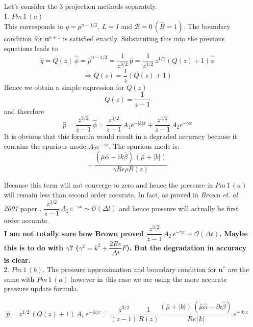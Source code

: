 Let's consider the 3 projection methods separately.\\
1. $Pm\,1 \, (a)$\\
This corresponds to $q = p^{n-1/2}$, $L = I$ and $\mathcal{B} = 0 \, (\hat{B} = 1)$. The boundary condition for $\textbf{u}^{n+1}$ is satisfied exactly. Substituting this into the previous equations leads to
\begin{equation*}
\hat{q} = Q(z)\,\hat{\phi} = \hat{p}^{n-1/2} = \dfrac{1}{z^{3/2}}\,\hat{p} = \dfrac{1}{z^{3/2}} \, z^{1/2} (Q(z) + 1) \hat{\phi}
\end{equation*}
\begin{equation*}
\Rightarrow Q(z) = \dfrac{1}{z} (Q(z) + 1)
\end{equation*}
Hence we obtain a simple expression for $Q(z)$
\begin{equation}
Q(z) = \dfrac{1}{z-1}
\end{equation}
and therefore
\begin{equation}
\hat{p} = \dfrac{z^{3/2}}{z-1} \, \hat{\phi} = \dfrac{z^{3/2}}{z-1}\, A_1 e^{-|k|x} + \dfrac{z^{3/2}}{z-1} \, A_2 e^{-\gamma x}
\end{equation}
It is obvious that this formula would result in a degraded accuracy because it contains the spurious mode $A_2 e^{-\gamma x}$. The spurious mode is:
\begin{equation*}
- \, \dfrac{(\bar{\mu} \hat{\alpha} - ik \hat{\beta})\,(\bar{\mu} + |k|)}{\gamma Re \rho R(z)}
\end{equation*}

Because this term will not converge to zero and hence the pressure in $Pm \, 1\,(a)$ will remain less than second order accurate. In fact, as proved in \emph{Brown et. al 2001} paper \cite{brown2001accurate}, $\dfrac{z^{3/2}}{z-1}\,A_2 \,e^{-\gamma x} \sim \mathcal{O} (\Delta t)$ and hence pressure will actually be first order accurate.\\
\textbf{I am not totally sure how Brown proved $\dfrac{z^{3/2}}{z-1}\,A_2 \,e^{-\gamma x} \sim \mathcal{O} (\Delta t)$. Maybe this is to do with $\gamma$? ($\gamma^2 = k^2 + \dfrac{2Re}{\Delta t}F$). But the degradation in accuracy is clear. }\\

2. $Pm \, 1\,(b)$. The pressure approximation and boundary condition for $\textbf{u}^*$ are the same with $Pm\,1\,(a)$ however in this case we are using the more accurate pressure update formula. 

\begin{dmath}
\hat{p} = z^{1/2}\,(Q(z) + 1)\,A_1\,e^{-|k|x}
= \dfrac{z^{3/2}}{(z-1)} \dfrac{1}{R(z)} \dfrac{(\bar{\mu} + |k|)\,(\bar{\mu} \hat{\alpha}  -ik \hat{\beta})}{Re\,|k|}\,e^{-|k|x}
\end{dmath}

